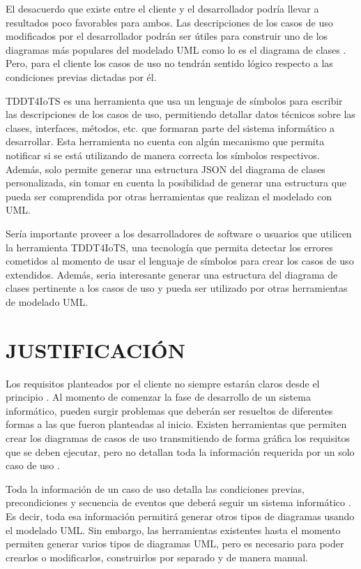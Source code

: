\documentclass[12pt,a4paper,final, xcolor=table, table]{article}
\begin{document}
	El desacuerdo que existe entre el cliente y el desarrollador podría llevar a resultados poco favorables para ambos. Las descripciones de los casos de uso modificados por el desarrollador podrán ser útiles para construir uno de los diagramas más populares del modelado UML como lo es el diagrama de clases \parencite{Abdelnabi2021}. Pero, para el cliente los casos de uso no tendrán sentido lógico respecto a las condiciones previas dictadas por él.
	
	TDDT4IoTS es una herramienta que usa un lenguaje de símbolos para escribir las descripciones de los casos de uso, permitiendo detallar datos técnicos sobre las clases, interfaces, métodos, etc. que formaran parte del sistema informático a desarrollar. Esta herramienta no cuenta con algún mecanismo que permita notificar si se está utilizando de manera correcta los símbolos respectivos. Además, solo permite generar una estructura JSON del diagrama de clases personalizada, sin tomar en cuenta la posibilidad de generar una estructura que pueda ser comprendida por otras herramientas que realizan el modelado con UML.
	
	Sería importante proveer a los desarrolladores de software o usuarios que utilicen la herramienta TDDT4IoTS, una tecnología que permita detectar los errores cometidos al momento de usar el lenguaje de símbolos para crear los casos de uso extendidos. Además, seria interesante generar una estructura del diagrama de clases pertinente a los casos de uso y pueda ser utilizado por otras herramientas de modelado UML.
	
	
	\section{JUSTIFICACIÓN}
	
	Los requisitos planteados por el cliente no siempre estarán claros desde el principio \parencite{iqbal2020}. Al momento de comenzar la fase de desarrollo de un sistema informático, pueden surgir problemas que deberán ser resueltos de diferentes formas a las que fueron planteadas al inicio. Existen herramientas que permiten crear los diagramas de casos de uso transmitiendo de forma gráfica los requisitos que se deben ejecutar, pero no detallan toda la información requerida por un solo caso de uso \parencite{Abdelnabi2021}.
	
	Toda la información de un caso de uso detalla las condiciones previas, precondiciones y secuencia de eventos que deberá seguir un sistema informático \parencite{iqbal2020}. Es decir, toda esa información permitirá generar otros tipos de diagramas usando el modelado UML. Sin embargo, las herramientas existentes hasta el momento permiten generar varios tipos de diagramas UML, pero es necesario para poder crearlos o modificarlos, construirlos por separado y de manera manual.
	
\end{document}
